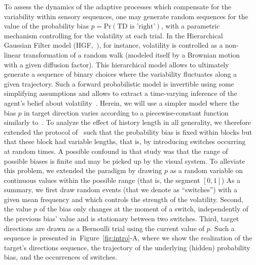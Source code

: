 \documentclass[12pt,english]{article}%
\newcommand{\citep}[1]{\parencite{#1}}
\newcommand{\citet}[1]{\textcite{#1}}
\newcommand{\seeFig}[1]{Figure~\ref{fig:#1}}
\begin{document}
To assess the dynamics of the adaptive processes
which compensate for the variability within sensory sequences,
one may generate random sequences for the value of the probability bias $p = \text{Pr}(\text{TD is 'right'})$,
with a parametric mechanism controlling for the volatility at each trial.
In the Hierarchical Gaussian Filter model (HGF,~\citet{Mathys11}), for instance,
volatility is controlled as a non-linear transformation
of a random walk (modeled itself by a Brownian motion with a given diffusion factor).
This hierarchical model allows to ultimately generate a sequence of binary choices
where the variability fluctuates along a given trajectory.
Such a forward probabilistic model is invertible
using some simplifying assumptions and allows
to extract a time-varying inference of the agent's belief about volatility~\citep{Vossel14}.
Herein, we will use a simpler model where
the bias $p$ in target direction varies according to a piecewise-constant function
similarly to~\citet{Meyniel13}.
To analyze the effect of history length in all generality,
we therefore extended the protocol of~\citep{Montagnini2010} such that the probability bias
is fixed within blocks but that these block had variable lengths,
that is, by introducing switches occurring at random times.
A possible confound in that study
was that the range of possible biases is finite and 
may be picked up by the visual system.
To alleviate this problem, we extended the paradigm
by drawing $p$ as a random variable on continuous values 
within the possible range (that is, the segment $[ 0, 1 ]$)
As a summary, we first draw random events (that we denote as ``switches'')
with a given mean frequency and which controls the strength of the volatility.
Second, the value $p$ of the bias only changes at the moment of a switch,
independently of the previous bias' value
and is stationary between two switches.
Third, target directions are drawn as a Bernoulli trial using the current value of $p$.
Such a sequence is presented in~\seeFig{intro}-A, 
where we show the realization of the target's directions sequence,
the trajectory of the underlying (hidden) probability bias, and
the occurrences of switches.
\end{document}
